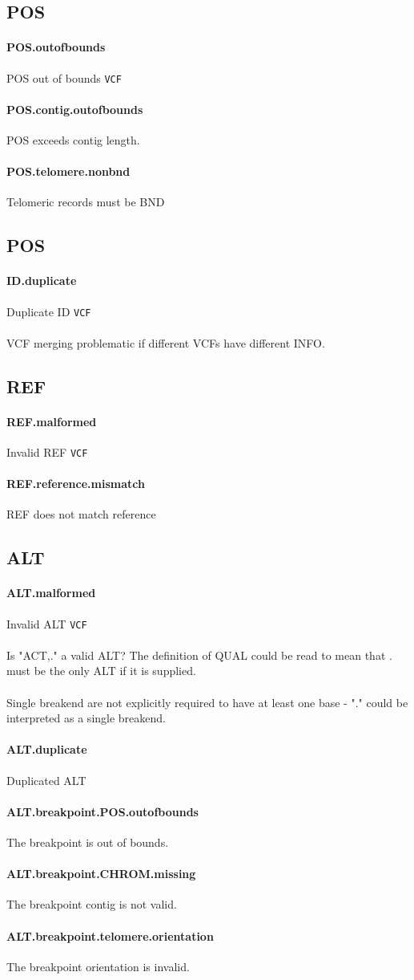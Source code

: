 \documentclass[10pt]{article}
\newcommand{\vcfstrictrule}[5]{
	\paragraph{#1} #2 #4	
	#5
	\par
}
\newcommand{\vcfspec}{\tt VCF}
\newcommand{\SPECISSUE}[1]{\paragraph{} #1}
\begin{document}
\subsection{POS}

\vcfstrictrule{POS.outofbounds}{POS out of bounds }{ Value of out of representable bounds. Minimum value is 0. Maximum value is 2,147,483,647 (2^31-1). }{\vcfspec}{}
\vcfstrictrule{POS.contig.outofbounds}{POS exceeds contig length. }{ POS must be less than, or equal to, the contig length + 1 }{}{}
\vcfstrictrule{POS.telomere.nonbnd}{Telomeric records must be BND }{ Telomeric with POS of 0 or contig length + 1 must be BND symbolic alleles.}{}{}

\subsection{POS}

\vcfstrictrule{ID.duplicate}{ Duplicate ID }{ One or more of the semi-colon separated IDs in this field is not unique. }{\vcfspec}{}
\SPECISSUE{VCF merging problematic if different VCFs have different INFO.}

\subsection{REF}

\vcfstrictrule{REF.malformed}{ Invalid REF }{ REF does not match the regex [ACGTNacgtn]+. }{\vcfspec}{}
\vcfstrictrule{REF.reference.mismatch}{REF does not match reference }{ REF does not match reference genome sequence. }{}{}

\subsection{ALT}

\vcfstrictrule{ALT.malformed}{ Invalid ALT }{ ALT does not match the regex [ACGTNacgtn]+, \tt{.}, \tt{*}, a breakpoint string, a single breakend string, or a symbolic allele. }{\vcfspec}{}
\SPECISSUE{Is "ACT,." a valid ALT? The definition of QUAL could be read to mean that . must be the only ALT if it is supplied.}
\SPECISSUE{Single breakend are not explicitly required to have at least one base - "." could be interpreted as a single breakend.}
\vcfstrictrule{ALT.duplicate}{ Duplicated ALT }{ ALT alleles are not unique within this record. }{}{}
\vcfstrictrule{ALT.breakpoint.POS.outofbounds }{ The breakpoint is out of bounds. }{ The position of the other side of the breakpoint occurs is greater than the relevant contig length + 1}{}{}
\vcfstrictrule{ALT.breakpoint.CHROM.missing }{ The breakpoint contig is not valid. }{ No ##contig meta-information line found for this record, and, if angle bracketed, is not found in the assembly file. }{}{}
\vcfstrictrule{ALT.breakpoint.telomere.orientation }{The breakpoint orientation is invalid.}{ If the breakpoint position is 0 or contig length + 1, the breakpoint orientation must be towards to telomere. }{}{}
\end{document}
